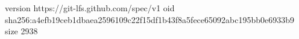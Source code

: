 version https://git-lfs.github.com/spec/v1
oid sha256:a4efb19ceb1dbaea2596109c22f15df1b43f8a5fece65092abc195bb0e6933b9
size 2938
